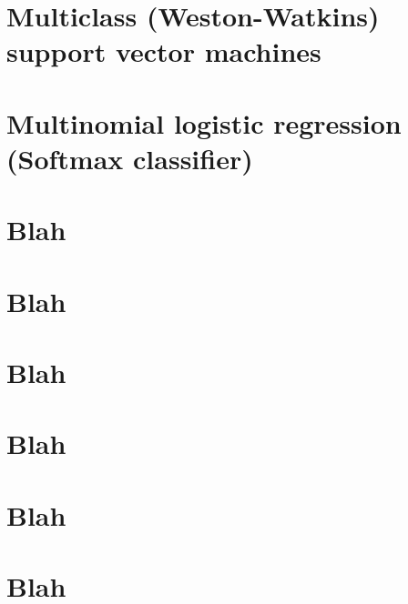 \section{Multiclass (Weston-Watkins) support vector machines}
\section{Multinomial logistic regression (Softmax classifier)}
\section{Blah}
\section{Blah}
\section{Blah}
\section{Blah}
\section{Blah}
\section{Blah}